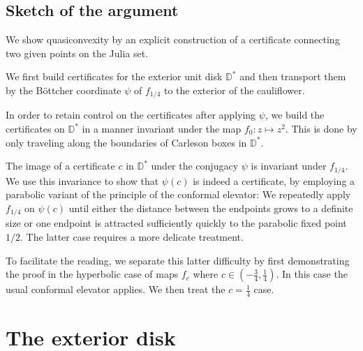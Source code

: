 \subsection{Sketch of the argument}

We show quasiconvexity by an explicit construction of a certificate connecting two given points on the Julia set.

We first build certificates for the exterior unit disk $\mathbb D ^*$ and then transport them by the Böttcher coordinate $\psi$ of $f_{1/4}$ to the exterior of the cauliflower.

In order to retain control on the certificates after applying $\psi$, we build the certificates on $\mathbb D^*$ in a manner invariant under the map $f_0: z\mapsto z^2$. This is done by only traveling along the boundaries of Carleson boxes in $\mathbb D^{*}$. 

The image of a certificate $c$ in $\mathbb D^{*}$ under the conjugacy $\psi$ is invariant under $f_{1/4}$. We use this invariance to show that $\psi(c)$ is indeed a certificate, by employing a parabolic variant of the principle of the conformal elevator: We repeatedly apply $f_{1/4}$ on $\psi(c)$ until either the distance between the endpoints grows to a definite size or one endpoint is attracted sufficiently quickly to the parabolic fixed point $1/2$. The latter case requires a more delicate treatment.

To facilitate the reading, we separate this latter difficulty by first demonstrating the proof in the hyperbolic case of maps $f_c$ where  $c\in\left(-\frac 34,\frac{1}{4}\right)$. In this case the usual conformal elevator applies. We then treat the $c=\frac 14$ case.



\section{The exterior disk}

\begin{comment}
The exterior $\D^{*}=\left\{ \left|z\right|>1\right\} $ of the unit
disk is trivially quasiconvex by connecting points along the perimeter of the circle. However, these paths follow the boundary closely and their length would blow up if we transport them to the exterior of $\mathcal{J}(f_{c})$, $c\neq0$, via the Riemann map. Instead,
\end{comment}

